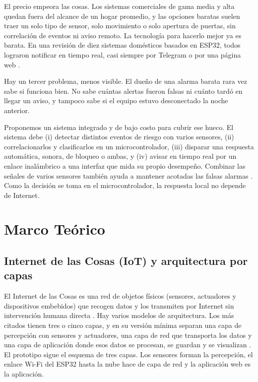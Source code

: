 \documentclass[conference]{IEEEtran}
\begin{document}
El precio empeora las cosas. Los sistemas comerciales de gama media y alta quedan fuera del alcance de un hogar promedio, y las opciones baratas suelen traer un solo tipo de sensor, solo movimiento o solo apertura de puertas, sin correlación de eventos ni aviso remoto. La tecnología para hacerlo mejor ya es barata. En una revisión de diez sistemas domésticos basados en ESP32, todos lograron notificar en tiempo real, casi siempre por Telegram o por una página web \cite{oktafiani2025esp32}.

Hay un tercer problema, menos visible. El dueño de una alarma barata rara vez sabe si funciona bien. No sabe cuántas alertas fueron falsas ni cuánto tardó en llegar un aviso, y tampoco sabe si el equipo estuvo desconectado la noche anterior.

Proponemos un sistema integrado y de bajo costo para cubrir ese hueco. El sistema debe (i) detectar distintos eventos de riesgo con varios sensores, (ii) correlacionarlos y clasificarlos en un microcontrolador, (iii) disparar una respuesta automática, sonora, de bloqueo o ambas, y (iv) avisar en tiempo real por un enlace inalámbrico a una interfaz que mida su propio desempeño. Combinar las señales de varios sensores también ayuda a mantener acotadas las falsas alarmas \cite{pugh2015fusion}. Como la decisión se toma en el microcontrolador, la respuesta local no depende de Internet.

\section{Marco Teórico}
\label{sec:marco-teorico}

\subsection{Internet de las Cosas (IoT) y arquitectura por capas}
El Internet de las Cosas es una red de objetos físicos (sensores, actuadores y dispositivos embebidos) que recogen datos y los transmiten por Internet sin intervención humana directa \cite{alfuqaha2015survey}. Hay varios modelos de arquitectura. Los más citados tienen tres o cinco capas, y en su versión mínima separan una capa de percepción con sensores y actuadores, una capa de red que transporta los datos y una capa de aplicación donde esos datos se procesan, se guardan y se visualizan \cite{alfuqaha2015survey, ray2018survey}. El prototipo sigue el esquema de tres capas. Los sensores forman la percepción, el enlace Wi-Fi del ESP32 hasta la nube hace de capa de red y la aplicación web es la aplicación.
\end{document}
